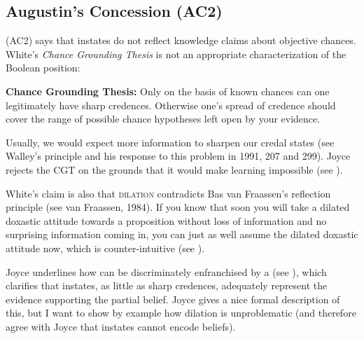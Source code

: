 \documentclass[11pt]{article}
\begin{document}
\subsection{Augustin's Concession (AC2)}
\label{jj2}

(AC2) says that instates do not reflect knowledge claims about
objective chances. White's \emph{Chance Grounding Thesis} is not an
appropriate characterization of the Boolean position:

\begin{quotex}
  \textbf{Chance Grounding Thesis:} Only on the basis of known chances
  can one legitimately have sharp credences. Otherwise one's spread of
  credence should cover the range of possible chance hypotheses left
  open by your evidence. 
\end{quotex}

Usually, we would expect more information to sharpen our credal states
(see Walley's 
principle and his response to this problem in
1991, 207 and 299).
Joyce rejects the CGT on the grounds that it would make learning
impossible (see ).

White's claim is also that \textsc{dilation} contradicts Bas van
Fraassen's reflection principle (see van Fraassen,
1984). If you know that soon you will take
a dilated doxastic attitude towards a proposition without loss of
information and no surprising information coming in, you can just as
well assume the dilated doxastic attitude now, which is
counter-intuitive (see ).

Joyce underlines how  can be discriminately
enfranchised by a  (see
), which clarifies that instates, as little as
sharp credences, adequately represent the evidence supporting the
partial belief. Joyce gives a nice formal description of this, but I
want to show by example how dilation is unproblematic (and therefore
agree with Joyce that instates cannot encode beliefs).

\end{document}
